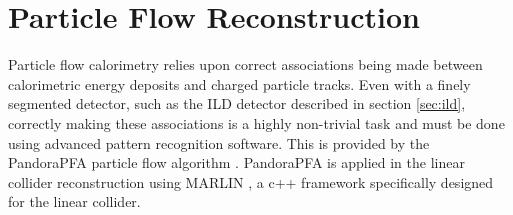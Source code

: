 \section{Particle Flow Reconstruction}
\label{sec:reconstruction}
Particle flow calorimetry relies upon correct associations being made between calorimetric energy deposits and charged particle tracks.  Even with a finely segmented detector, such as the ILD detector described in section \ref{sec:ild}, correctly making these associations is a highly non-trivial task and must be done using advanced pattern recognition software.  This is provided by the PandoraPFA particle flow algorithm \cite{Marshall:2015rfa}.  PandoraPFA is applied in the linear collider reconstruction using MARLIN \cite{Gaede:2006pj}, a c++ framework specifically designed for the linear collider.  


